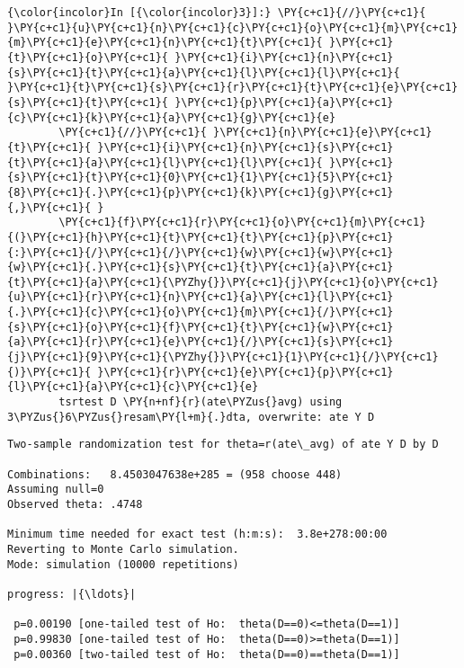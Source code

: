 \documentclass[11pt,notitlepage]{article}\usepackage[]{graphicx}\usepackage[]{color}
\makeatletter
\newenvironment{kframe}{%
 \def\at@end@of@kframe{}%
 \ifinner\ifhmode%
  \def\at@end@of@kframe{\end{minipage}}%
  \begin{minipage}{\columnwidth}%
 \fi\fi%
 \def\FrameCommand##1{\hskip\@totalleftmargin \hskip-\fboxsep
 \colorbox{shadecolor}{##1}\hskip-\fboxsep
     \hskip-\linewidth \hskip-\@totalleftmargin \hskip\columnwidth}%
 \MakeFramed {\advance\hsize-\width
   \@totalleftmargin\z@ \linewidth\hsize
   \@setminipage}}%
 {\par\unskip\endMakeFramed%
 \at@end@of@kframe}
\newenvironment{knitrout}{}{} %
\makeatother
\begin{document}
\begin{knitrout}
\begin{kframe}
    \begin{Verbatim}[commandchars=\\\{\}]
{\color{incolor}In [{\color{incolor}3}]:} \PY{c+c1}{//}\PY{c+c1}{ }\PY{c+c1}{u}\PY{c+c1}{n}\PY{c+c1}{c}\PY{c+c1}{o}\PY{c+c1}{m}\PY{c+c1}{m}\PY{c+c1}{e}\PY{c+c1}{n}\PY{c+c1}{t}\PY{c+c1}{ }\PY{c+c1}{t}\PY{c+c1}{o}\PY{c+c1}{ }\PY{c+c1}{i}\PY{c+c1}{n}\PY{c+c1}{s}\PY{c+c1}{t}\PY{c+c1}{a}\PY{c+c1}{l}\PY{c+c1}{l}\PY{c+c1}{ }\PY{c+c1}{t}\PY{c+c1}{s}\PY{c+c1}{r}\PY{c+c1}{t}\PY{c+c1}{e}\PY{c+c1}{s}\PY{c+c1}{t}\PY{c+c1}{ }\PY{c+c1}{p}\PY{c+c1}{a}\PY{c+c1}{c}\PY{c+c1}{k}\PY{c+c1}{a}\PY{c+c1}{g}\PY{c+c1}{e}
        \PY{c+c1}{//}\PY{c+c1}{ }\PY{c+c1}{n}\PY{c+c1}{e}\PY{c+c1}{t}\PY{c+c1}{ }\PY{c+c1}{i}\PY{c+c1}{n}\PY{c+c1}{s}\PY{c+c1}{t}\PY{c+c1}{a}\PY{c+c1}{l}\PY{c+c1}{l}\PY{c+c1}{ }\PY{c+c1}{s}\PY{c+c1}{t}\PY{c+c1}{0}\PY{c+c1}{1}\PY{c+c1}{5}\PY{c+c1}{8}\PY{c+c1}{.}\PY{c+c1}{p}\PY{c+c1}{k}\PY{c+c1}{g}\PY{c+c1}{,}\PY{c+c1}{ }
        \PY{c+c1}{f}\PY{c+c1}{r}\PY{c+c1}{o}\PY{c+c1}{m}\PY{c+c1}{(}\PY{c+c1}{h}\PY{c+c1}{t}\PY{c+c1}{t}\PY{c+c1}{p}\PY{c+c1}{:}\PY{c+c1}{/}\PY{c+c1}{/}\PY{c+c1}{w}\PY{c+c1}{w}\PY{c+c1}{w}\PY{c+c1}{.}\PY{c+c1}{s}\PY{c+c1}{t}\PY{c+c1}{a}\PY{c+c1}{t}\PY{c+c1}{a}\PY{c+c1}{\PYZhy{}}\PY{c+c1}{j}\PY{c+c1}{o}\PY{c+c1}{u}\PY{c+c1}{r}\PY{c+c1}{n}\PY{c+c1}{a}\PY{c+c1}{l}\PY{c+c1}{.}\PY{c+c1}{c}\PY{c+c1}{o}\PY{c+c1}{m}\PY{c+c1}{/}\PY{c+c1}{s}\PY{c+c1}{o}\PY{c+c1}{f}\PY{c+c1}{t}\PY{c+c1}{w}\PY{c+c1}{a}\PY{c+c1}{r}\PY{c+c1}{e}\PY{c+c1}{/}\PY{c+c1}{s}\PY{c+c1}{j}\PY{c+c1}{9}\PY{c+c1}{\PYZhy{}}\PY{c+c1}{1}\PY{c+c1}{/}\PY{c+c1}{)}\PY{c+c1}{ }\PY{c+c1}{r}\PY{c+c1}{e}\PY{c+c1}{p}\PY{c+c1}{l}\PY{c+c1}{a}\PY{c+c1}{c}\PY{c+c1}{e}
        tsrtest D \PY{n+nf}{r}(ate\PYZus{}avg) using 3\PYZus{}6\PYZus{}resam\PY{l+m}{.}dta, overwrite: ate Y D
\end{Verbatim}

    \begin{Verbatim}[commandchars=\\\{\}]
Two-sample randomization test for theta=r(ate\_avg) of ate Y D by D

Combinations:   8.4503047638e+285 = (958 choose 448)
Assuming null=0
Observed theta: .4748

Minimum time needed for exact test (h:m:s):  3.8e+278:00:00
Reverting to Monte Carlo simulation.
Mode: simulation (10000 repetitions)

progress: |{\ldots}|

 p=0.00190 [one-tailed test of Ho:  theta(D==0)<=theta(D==1)]
 p=0.99830 [one-tailed test of Ho:  theta(D==0)>=theta(D==1)]
 p=0.00360 [two-tailed test of Ho:  theta(D==0)==theta(D==1)]


\end{Verbatim}
\end{kframe}
\end{knitrout}
\end{document}
